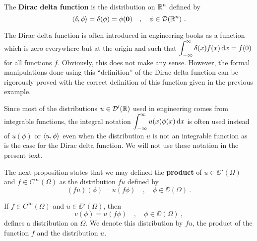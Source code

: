 \begin{egg}
The {\bfseries Dirac delta function} is
the distribution on $\displaystyle \mathbb{R}^n$ defined by
\[
\left\langle{\delta} , {\phi}\right\rangle = \delta(\phi) = \phi({\bm{0}}) \quad , \quad
\phi \in \mathcal{D}(\mathbb{R}^n) \ .
\]
\end{egg}

\begin{rmk}
The Dirac delta function is often introduced in engineering books
as a function which is zero everywhere but at the origin and such that
$\displaystyle \int_{-\infty}^\infty \delta(x)f(x) \,\mathrm{d}{x} = f(0)$ for
all functions $f$.  Obviously, this does not make any sense.  However,
the formal manipulations done using this ``definition'' of the
Dirac delta function can be rigorously proved with the correct
definition of this function given in the previous example.

Since most of the distributions $\displaystyle u \in \mathcal{D}'(\mathbb{R})$ used in
engineering comes from integrable functions, the integral notation
$\displaystyle \int_{-\infty}^\infty u(x) \phi(x)\,\mathrm{d}{x}$ is often used
instead of $u(\phi)$ or $\left\langle{u} , {\phi}\right\rangle$ even when the distribution
$u$ is not an integrable function as is the case for the Dirac delta
function.  We will not use these notation in the present text.
\end{rmk}

The next proposition states that we may defined the
{\bfseries product} of $u \in \DD'(\Omega)$ and
$\displaystyle f \in C^\infty(\Omega)$ as the distribution $f u$ defined by
\[
(f u)(\phi) = u(f \phi) \quad , \quad \phi \in \DD(\Omega) \ .
\]

\begin{prop} \label{distr_product}
If $\displaystyle f\in C^\infty(\Omega)$ and $u \in \DD'(\Omega)$, then
\[
v(\phi) = u(f \phi) \quad , \quad \phi \in \DD(\Omega) \ ,
\]
defines a distribution on $\Omega$.  We denote this distribution by
$f u$, the product of the function $f$ and the distribution $u$.
\end{prop}

